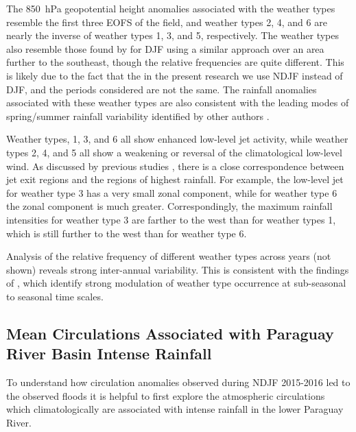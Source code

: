 \documentclass[twocol]{ametsoc}
\begin{document}
The \SI{850}{\hecto\pascal} geopotential height anomalies associated with the weather types resemble the first three EOFS of the field, and weather types 2, 4, and 6 are nearly the inverse of weather types 1, 3, and 5, respectively.
The weather types also resemble those found by \citet{Munoz2015} for DJF using a similar approach over an area further to the southeast, though the relative frequencies are quite different.
This is likely due to the fact that the in the present research we use NDJF instead of DJF, and the periods considered are not the same.
The rainfall anomalies associated with these weather types are also consistent with the leading modes of spring/summer rainfall variability identified by other authors \citep{Grimm:2009bq}.

Weather types, 1, 3, and 6 all show enhanced low-level jet activity, while weather types 2, 4, and 5 all show a weakening or reversal of the climatological low-level wind.
As discussed by previous studies \citep{Saulo:2007km,Salio:2007gd,Marengo2004,Velasco1987}, there is a close correspondence between jet exit regions and the regions of highest rainfall.
For example, the low-level jet for weather type 3 has a very small zonal component, while for weather type 6 the zonal component is much greater.
Correspondingly, the maximum rainfall intensities for weather type 3 are farther to the west than for weather types 1, which is still further to the west than for weather type 6.

Analysis of the relative frequency of different weather types across years (not shown) reveals strong inter-annual variability.
This is consistent with the findings of \citet{Munoz2015,Munoz2016}, which identify strong modulation of weather type occurrence at sub-seasonal to seasonal time scales.

\subsection{Mean Circulations Associated with Paraguay River Basin Intense Rainfall} \label{sec:rainfall-circulation}

To understand how circulation anomalies observed during NDJF 2015-2016 led to the observed floods it is helpful to first explore the atmospheric circulations which climatologically are associated with intense rainfall in the lower Paraguay River.
\end{document}
